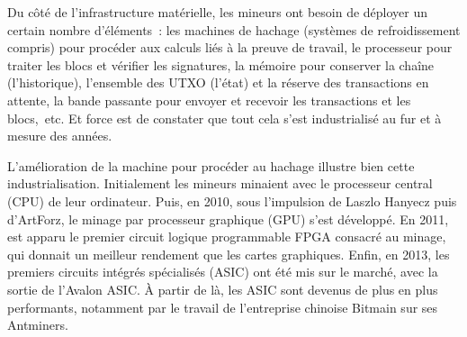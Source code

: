 Du côté de l'infrastructure matérielle, les mineurs ont besoin de déployer un certain nombre d'éléments~: les machines de hachage (systèmes de refroidissement compris) pour procéder aux calculs liés à la preuve de travail, le processeur pour traiter les blocs et vérifier les signatures, la mémoire pour conserver la chaîne (l'historique), l'ensemble des UTXO (l'état) et la réserve des transactions en attente, la bande passante pour envoyer et recevoir les transactions et les blocs,~etc. Et force est de constater que tout cela s'est industrialisé au fur et à mesure des années.



L'amélioration de la machine pour procéder au hachage illustre bien cette industrialisation. Initialement les mineurs minaient avec le processeur central (CPU) de leur ordinateur. Puis, en 2010, sous l'impulsion de Laszlo Hanyecz puis d'ArtForz, le minage par processeur graphique (GPU) s'est développé. En 2011, est apparu le premier circuit logique programmable FPGA consacré au minage, qui donnait un meilleur rendement que les cartes graphiques. Enfin, en 2013, les premiers circuits intégrés spécialisés (ASIC) ont été mis sur le marché, avec la sortie de l'Avalon ASIC. À partir de là, les ASIC sont devenus de plus en plus performants, notamment par le travail de l'entreprise chinoise Bitmain sur ses Antminers.


